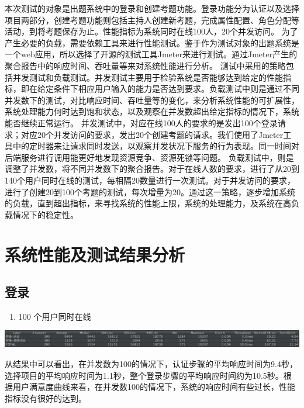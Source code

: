 \documentclass[hyperref, a4paper]{ctexart}
\providecommand{\tightlist}{%
  \setlength{\itemsep}{0pt}\setlength{\parskip}{0pt}}
\begin{document}
本次测试的对象是出题系统中的登录和创建考题功能。登录功能分为认证以及选择项目两部分，创建考题功能则包括主持人创建新考题，完成属性配置、角色分配等活动，到将考题保存为止。性能指标为系统同时在线100人，20个并发访问。
为了产生必要的负载，需要依赖工具来进行性能测试。鉴于作为测试对象的出题系统是一个web应用，所以选择了开源的测试工具Jmeter来进行测试。通过Jmeter产生的聚合报告中的响应时间、吞吐量等来对系统性能进行分析。
测试中采用的策略包括并发测试和负载测试。并发测试主要用于检验系统是否能够达到给定的性能指标，即在给定条件下相应用户输入的能力是否达到要求。负载测试中则是通过不同并发数下的测试，对比响应时间、吞吐量等的变化，来分析系统性能的可扩展性，系统处理能力何时达到饱和状态，以及观察在并发数超出给定指标的情况下，系统能否继续正常运行。
并发测试中，对应在线100人的要求的是发出100个登录请求；对应20个并发访问的要求，发出20个创建考题的请求。我们使用了Jmeter工具中的定时器来让请求同时发送，以观察并发状况下服务的行为表现。同一时间对后端服务进行调用能更好地发现资源竞争、资源死锁等问题。
负载测试中，则是调整了并发数，将不同并发数下的聚合报告。对于在线人数的要求，进行了从20到140个用户同时在线的测试，每相隔20数量进行一次测试。对于并发访问的要求，进行了创建20到100个考题的测试，每次增量为20。通过这一策略，逐步增加系统的负载，直到超出指标，来寻找系统的性能上限，系统的处理能力，及系统在高负载情况下的稳定性。

\hypertarget{ux7cfbux7edfux6027ux80fdux53caux6d4bux8bd5ux7ed3ux679cux5206ux6790}{%
\section{系统性能及测试结果分析}\label{ux7cfbux7edfux6027ux80fdux53caux6d4bux8bd5ux7ed3ux679cux5206ux6790}}

\hypertarget{ux767bux5f55}{%
\subsection{登录}\label{ux767bux5f55}}

\begin{enumerate}
\def\labelenumi{\arabic{enumi}.}
\tightlist
\item
  100 个用户同时在线
\end{enumerate}

\includegraphics{resources/wcn/login_100.png}

从结果中可以看出，在并发数为100的情况下，认证步骤的平均响应时间为9.4秒，选择项目的平均响应时间为1.1秒，整个登录步骤的平均响应时间约为10.5秒。根据用户满意度曲线来看，在并发数100的情况下，系统的响应时间有些过长，性能指标没有很好的达到。
\end{document}
